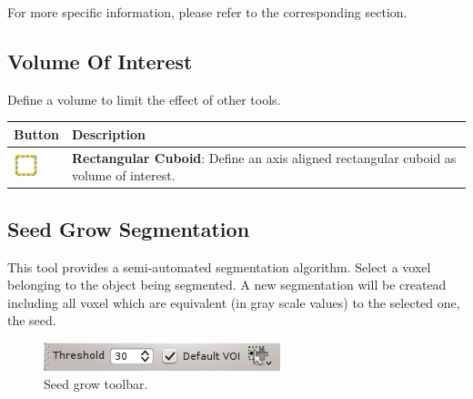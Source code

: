 For more specific information, please refer to the corresponding section.

\subsection{Volume Of Interest}

Define a volume to limit the effect of other tools.\\

\begin{tabular}{| m{1.3cm} | m{13.5cm} |}
\hline
\textbf{Button} & \textbf{Description}\\
\hline
\includegraphics[width=0.7cm]{../../frontend/toolbar/voi/rsc/roi} &
\textbf{Rectangular Cuboid}: Define an axis aligned rectangular cuboid as volume
of interest.\\
\hline
\end{tabular}

\subsection{Seed Grow Segmentation}

This tool provides a semi-automated segmentation algorithm. Select a voxel
belonging to the object being segmented. A new segmentation will be createad
including all voxel which are equivalent (in gray scale values) to the selected
one, the seed.

\begin{figure}[H]
\centering
\includegraphics{fig/SeedGrowSegmentation}
\caption{Seed grow toolbar.}
\end{figure}
\vspace{0.3cm}

